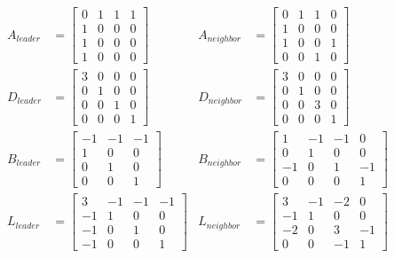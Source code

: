\documentclass[a4paper, 12pt]{report}
\begin{document}
\begin{displaymath}
\begin{aligned}
A_{leader} &= \begin{bmatrix} 0 & 1 & 1 & 1 \\ 1 & 0 & 0 & 0 \\ 1 & 0 & 0 & 0 \\ 1 & 0 & 0 & 0\end{bmatrix} 		& A_{neighbor} &= \begin{bmatrix} 0 & 1 & 1 & 0 \\ 1 & 0 & 0 & 0 \\ 1 & 0 & 0 & 1 \\ 0 & 0 & 1 & 0\end{bmatrix} \\
D_{leader} &= \begin{bmatrix} 3 & 0 & 0 & 0 \\ 0 & 1 & 0 & 0 \\ 0 & 0 & 1 & 0 \\ 0 & 0 & 0 & 1\end{bmatrix}		& D_{neighbor} &= \begin{bmatrix} 3 & 0 & 0 & 0 \\ 0 & 1 & 0 & 0 \\ 0 & 0 & 3 & 0 \\ 0 & 0 & 0 & 1\end{bmatrix} \\
B_{leader} &= \begin{bmatrix} -1 & -1 & -1 \\ 1 & 0 & 0 \\ 0 & 1 & 0 \\ 0 & 0 & 1\end{bmatrix} 				& B_{neighbor} &= \begin{bmatrix} 1 & -1 & -1 & 0 \\ 0 & 1 & 0 & 0 \\ -1 & 0 & 1 & -1 \\ 0 & 0 & 0 & 1\end{bmatrix} \\
L_{leader} &= \begin{bmatrix} 3 & -1 & -1 & -1 \\ -1 & 1 & 0 & 0 \\ -1 & 0 & 1 & 0 \\ -1 & 0 & 0 & 1\end{bmatrix} 	& L_{neighbor} &= \begin{bmatrix} 3 & -1 & -2 & 0 \\ -1 & 1 & 0 & 0 \\ -2 & 0 & 3 & -1 \\ 0 & 0 & -1 & 1\end{bmatrix}
\end{aligned}
\end{displaymath}
\end{document}
